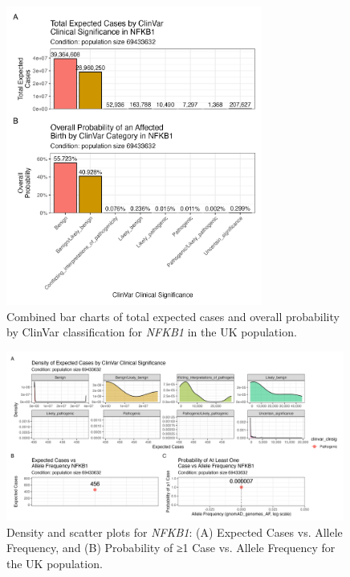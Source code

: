 \documentclass[a4paper,12pt]{article}
\begin{document}
\begin{figure}[H]
  \centering
  \includegraphics[width=0.75\textwidth]{../images/nfkb1_combined_bar_charts.png}
  \caption{Combined bar charts of total expected cases and overall probability by ClinVar classification for \textit{NFKB1} in the UK population.}
  \label{fig:nfkb1_combined_bar_charts}
\end{figure}

\begin{figure}[H]
  \centering
  \includegraphics[width=0.99\textwidth]{../images/nfkb1_scatterdense_expected_prob.png}
  \caption{Density and scatter plots for \textit{NFKB1}: (A) Expected Cases vs. Allele Frequency, and (B) Probability of ≥1 Case vs. Allele Frequency for the UK population.}
  \label{fig:nfkb1_scatterdense_expected_prob}
\end{figure}
\end{document}
